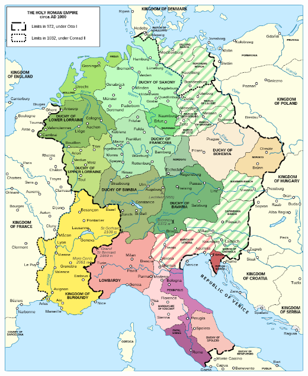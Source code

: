 \documentclass{article}
\begin{document}
\begin{minipage}{0.3\textwidth}
    \includegraphics[width=\linewidth]{srr_mapa_10.png}
\end{minipage}
\end{document}
